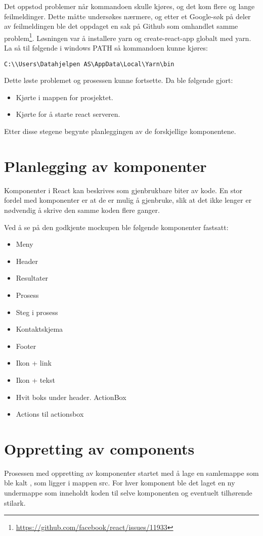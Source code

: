 Det oppstod problemer når kommandoen  skulle kjøres, og det kom flere og lange feilmeldinger. Dette måtte undersøkes nærmere, og etter et Google-søk på deler av feilmeldingen ble det oppdaget en sak på Github som omhandlet samme problem\footnote{\url{https://github.com/facebook/react/issues/11933}}.
Løsningen var å installere yarn og create-react-app globalt med yarn. La så til følgende i windows PATH så kommandoen kunne kjøres:
\begin{lstlisting}
C:\\Users\Datahjelpen AS\AppData\Local\Yarn\bin
\end{lstlisting}
Dette løste problemet og prosessen kunne fortsette. Da ble følgende gjort:

\begin{itemize}
\item Kjørte  i mappen for prosjektet.
\item Kjørte  for å starte react serveren.
\end{itemize}

Etter disse stegene begynte planleggingen av de forskjellige komponentene.

\section{Planlegging av komponenter}
Komponenter i React kan beskrives som gjenbrukbare biter av kode. En stor fordel med komponenter er at de er mulig å gjenbruke, slik at det ikke lenger er nødvendig å skrive den samme koden flere ganger. 

Ved å se på den godkjente mockupen ble følgende komponenter fastsatt: 
\begin{itemize}
\item Meny
\item Header
\item Resultater
\item Prosess
\item Steg i prosess
\item Kontaktskjema
\item Footer
\item Ikon + link
\item Ikon + tekst
\item Hvit boks under header. ActionBox
\item Actions til actionsbox
\end{itemize}

\section{Oppretting av components}
Prosessen med oppretting av komponenter startet med å lage en samlemappe som ble kalt , som ligger i mappen src. For hver komponent ble det laget en ny undermappe som inneholdt koden til selve komponenten og eventuelt tilhørende stilark.

